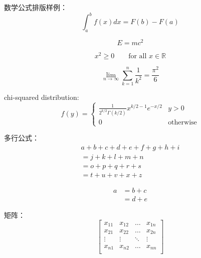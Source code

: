 \documentclass[12pt,hyperref,a4paper,UTF8]{ctexart}
\begin{document}
数学公式排版样例：
\begin{equation}\label{eq:1}
    \int_a^b f(x)dx = F(b)-F(a)
\end{equation}

\begin{equation}\label{eq:2}
    E = mc^2
\end{equation}

\begin{equation}\label{eq:3}
    x^2 \geq 0 \qquad \text{for all } x \in \mathbb{R}
\end{equation}

\begin{equation}\label{eq:4}
    \lim_{n \to \infty}
    \sum_{k=1}^n \frac{1}{k^2}
    = \frac{\pi^2}{6}
\end{equation}

chi-squared distribution:
\begin{equation}\label{eq:5}
    f(y) =
    \begin{cases}
        \frac{1}{2^{k/2}\Gamma(k/2)} x^{k/2-1} e^{-x/2} & y>0              \\
        0                                               & \text{otherwise}
    \end{cases}
\end{equation}

多行公式：
\begin{multline} \label{eq:6}
    a + b + c + d + e + f
    + g + h + i \\
    = j + k + l + m + n\\
    = o + p + q + r + s\\
    = t + u + v + x + z
\end{multline}

\begin{align} \label{eq:7}
    a & = b + c \\
      & = d + e
\end{align}

矩阵：
\begin{equation} \label{eq:8}
    \begin{bmatrix}
        x_{11} & x_{12} & \ldots & x_{1n} \\
        x_{21} & x_{22} & \ldots & x_{2n} \\
        \vdots & \vdots & \ddots & \vdots \\
        x_{n1} & x_{n2} & \ldots & x_{nn} \\
    \end{bmatrix}
\end{equation}
\end{document}
